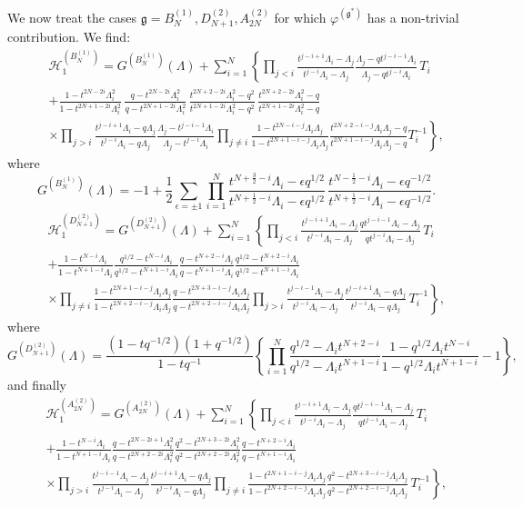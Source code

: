 \documentclass[12pt]{amsart}
\newcommand{\g}{{\mathfrak{g}}}
\newcommand{\cH}{{\mathcal{H}}}
\newcommand{\lL}{{\Lambda}}
\numberwithin{equation}{section}
\begin{document}
We now treat the cases $\g=B_N^{(1)},D_{N+1}^{(2)},A_{2N}^{(2)}$ for which $\varphi^{(\g^*)}$ has a non-trivial contribution. We find:
\begin{eqnarray*}
&&\cH_1^{(B_N^{(1)})}= G^{(B_N^{(1)})}(\Lambda)+\sum_{i=1}^N\left\{ 
\prod_{j< i} \frac{t^{j-i+1} \lL_i-\lL_j}{t^{j-i} \lL_i-\lL_j}\frac{\lL_j-qt^{j-i-1}\lL_i}{ \lL_j-qt^{j-i}\lL_i}\,T_i\right.\\
&&+\frac{1 -t^{2N-2i}\lL_i^2}{1-t^{2N+1-2i}\lL_i^2}\,\frac{q -t^{2N-2i}\lL_i^2}{q -t^{2N+1-2i}\lL_i^2}\,\frac{t^{2N+2-2i}\lL_i^2-q^2}{t^{2N+1-2i}\lL_i^2-q^2}\,\frac{t^{2N+2-2i}\lL_i^2-q}{t^{2N+1-2i}\lL_i^2-q}\\
&&\times \left.\prod_{j>i} \frac{t^{j-i+1} \lL_i-q\lL_j}{t^{j-i} \lL_i-q\lL_j}\frac{\lL_j-t^{j-i-1}\lL_i}{\lL_j-t^{j-i}\lL_i} \prod_{j\neq i} \frac{1 -t^{2N-i-j}\lL_i \lL_j}{1-t^{2N+1-i-j}\lL_i \lL_j} \frac{t^{2N+2-i-j}\lL_i \lL_j-q}{t^{2N+1-i-j}\lL_i \lL_j-q} T_i^{-1} \right\},
\end{eqnarray*}
where
$$
G^{(B_N^{(1)})}(\lL)=-1+\frac{1}{2}\sum_{\epsilon=\pm 1}
\prod_{i=1}^N \frac{t^{N+\frac{3}{2}-i}\Lambda_i -\epsilon q^{1/2}}{t^{N+\frac{1}{2}-i}\Lambda_i -\epsilon q^{1/2}}\, \frac{t^{N-\frac{1}{2}-i}\Lambda_i -\epsilon q^{-1/2}}{t^{N+\frac{1}{2}-i}\Lambda_i -\epsilon q^{-1/2}}.
$$
\begin{eqnarray*}
&&\cH_1^{(D_{N+1}^{(2)})}=G^{(D_{N+1}^{(2)})}(\lL)+\sum_{i=1}^N\left\{ \prod_{j<i} \frac{t^{j-i+1}\lL_i-\lL_j}{t^{j-i}\lL_i-\lL_j}
\frac{qt^{j-i-1}\lL_i-\lL_j}{qt^{j-i}\lL_i-\lL_j}\, T_i\right.\\
&&+\frac{1-t^{N-i}\Lambda_i}{1-t^{N+1-i}\Lambda_i} \frac{q^{1/2}-t^{N-i}\Lambda_i}{q^{1/2}-t^{N+1-i}\Lambda_i}
 \frac{q-t^{N+2-i}\Lambda_i}{q-t^{N+1-i}\Lambda_i} \frac{q^{1/2}-t^{N+2-i}\Lambda_i}{q^{1/2}-t^{N+1-i}\Lambda_i}\\
 &&\left. \times
\prod_{j\neq i} \frac{1-t^{2N+1-i-j}\lL_i\lL_j}{1-t^{2N+2-i-j}\lL_i\lL_j} 
\frac{q-t^{2N+3-i-j}\lL_i\lL_j}{q-t^{2N+2-i-j}\lL_i\lL_j}
\prod_{j>i}\frac{ t^{j-i-1}\lL_i-\lL_j}{ t^{j-i}\lL_i-\lL_j} \frac{t^{j-i+1}\lL_i-q\lL_j}{t^{j-i}\lL_i-q\lL_j}
\, T_i^{-1}\right\},
\end{eqnarray*}
where 
$$
G^{(D_{N+1}^{(2)})}(\lL)=\frac{(1-t q^{-1/2})(1+q^{-1/2})}{1-t q^{-1}}\left\{ 
\prod_{i=1}^N \frac{q^{1/2}- \lL_it^{N+2-i}}{q^{1/2}- \lL_it^{N+1-i}}\frac{1-q^{1/2}\lL_it^{N-i}}{1-q^{1/2}\lL_it^{N+1-i}}-1\right\},
$$
and finally
\begin{eqnarray*}
&&\cH_1^{(A_{2N}^{(2)})}=G^{(A_{2N}^{(2)})}(\lL)+\sum_{i=1}^N\left\{ \prod_{j<i} \frac{t^{j-i+1}\lL_i-\lL_j}{t^{j-i}\lL_i-\lL_j}
\frac{qt^{j-i-1}\lL_i-\lL_j}{qt^{j-i}\lL_i-\lL_j}\, T_i\right.\\
&&+\frac{1-t^{N-i}\Lambda_i}{1-t^{N+1-i}\Lambda_i} \frac{q-t^{2N-2i+1}\Lambda_i^2}{q-t^{2N+2-2i}\Lambda_i^2}
 \frac{q^2-t^{2N+3-2i}\Lambda_i^2}{q^2-t^{2N+2-2i}\Lambda_i^2} \frac{q-t^{N+2-i}\Lambda_i}{q-t^{N+1-i}\Lambda_i}\\
 &&\left. \times
 \prod_{j>i}\frac{ t^{j-i-1}\lL_i-\lL_j}{ t^{j-i}\lL_i-\lL_j} \frac{t^{j-i+1}\lL_i-q\lL_j}{t^{j-i}\lL_i-q\lL_j}
\prod_{j\neq i} \frac{1-t^{2N+1-i-j}\lL_i\lL_j}{1-t^{2N+2-i-j}\lL_i\lL_j} 
\frac{q^2-t^{2N+3-i-j}\lL_i\lL_j}{q^2-t^{2N+2-i-j}\lL_i\lL_j}
\, T_i^{-1}\right\},
\end{eqnarray*}
\end{document}
